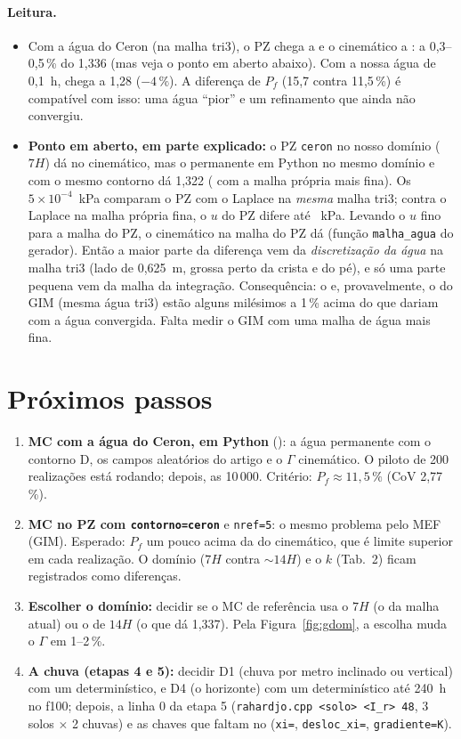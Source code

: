 \documentclass[11pt,a4paper]{article}
\begin{document}
\paragraph{Leitura.}
\begin{itemize}
  \item Com a água do Ceron (na malha tri3), o PZ chega a \gextceron{} e o cinemático a \gcin{}: a 0,3--0,5\,\% do
    1,336 (mas veja o ponto em aberto abaixo). Com a nossa
    água de 0,1~h, chega a 1,28 ($-4\,\%$). A diferença de $P_f$ (15,7 contra 11,5\,\%) é compatível com isso:
    uma água ``pior'' e um refinamento que ainda não convergiu.
  \item \textbf{Ponto em aberto, em parte explicado:} o PZ \texttt{ceron} no nosso domínio ($7H$) dá \gcin{} no
    cinemático, mas o permanente em Python no mesmo domínio e com o mesmo contorno dá 1,322 (\gpyfino{} com a malha
    própria mais fina). Os $5\times10^{-4}$~kPa comparam o PZ com o Laplace na \emph{mesma} malha tri3; contra o
    Laplace na malha própria fina, o $u$ do PZ difere até \dufino~kPa. Levando o $u$ fino para a malha do PZ, o
    cinemático na malha do PZ dá \gpzufino{} (função \texttt{malha\_agua} do gerador). Então a maior parte da
    diferença vem da \emph{discretização da água} na malha tri3 (lado de 0,625~m, grossa perto da crista e do pé), e só
    uma parte pequena vem da malha da integração. Consequência: o \gcin{} e, provavelmente, o \gextceron{} do GIM
    (mesma água tri3) estão alguns milésimos a 1\,\% acima do que dariam com a água convergida. Falta medir o GIM com
    uma malha de água mais fina.
\end{itemize}

\section{Próximos passos}
\begin{enumerate}
  \item \textbf{MC com a água do Ceron, em Python} (): a água permanente com o contorno
    D, os campos aleatórios do artigo e o $\Gamma$ cinemático. O piloto de 200 realizações está rodando; depois, as
    10\,000. Critério: $P_f \approx 11{,}5\,\%$ (CoV 2,77\,\%).
  \item \textbf{MC no PZ com \texttt{contorno=ceron}} e \texttt{nref=5}: o mesmo problema pelo MEF (GIM). Esperado:
    $P_f$ um pouco acima da do cinemático, que é limite superior em cada realização. O domínio ($7H$ contra
    $\sim 14H$) e o $k$ (Tab.~2) ficam registrados como diferenças.
  \item \textbf{Escolher o domínio:} decidir se o MC de referência usa o $7H$ (o da malha atual) ou o de $14H$
    (o que dá 1,337). Pela Figura~\ref{fig:gdom}, a escolha muda o $\Gamma$ em 1--2\,\%.
  \item \textbf{A chuva (etapas 4 e 5):} decidir D1 (chuva por metro inclinado ou vertical) com um determinístico, e
    D4 (o horizonte) com um determinístico até 240~h no f100; depois, a linha 0 da etapa 5 (\texttt{rahardjo.cpp
    <solo> <I\_r> 48}, 3 solos $\times$ 2 chuvas) e as chaves que faltam no  (\texttt{xi=},
    \texttt{desloc\_xi=}, \texttt{gradiente=K}).
\end{enumerate}
\end{document}

